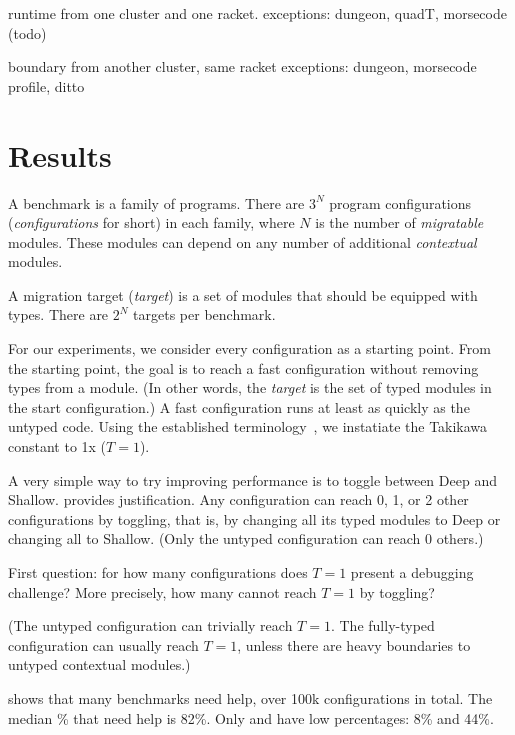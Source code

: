 \documentclass[acmsmall,review,anonymous]{acmart}
\begin{document}
runtime from one cluster and one racket.
exceptions: dungeon, quadT, morsecode (todo)

boundary from another cluster, same racket
exceptions: dungeon, morsecode
profile, ditto


\section{Results}
\label{s:data}

A benchmark is a family of programs.
There are $3^N$ program configurations (\emph{configurations} for short)
in each family, where $N$ is the number of \emph{migratable} modules.
These modules can depend on any number of additional \emph{contextual} modules.

A migration target (\emph{target}) is a set of modules that should be equipped
with types.
There are $2^N$ targets per benchmark.

For our experiments, we consider every configuration as a starting point.
From the starting point, the goal is to reach a fast configuration without
removing types from a module.
(In other words, the \emph{target} is the set of typed modules in the start
configuration.)
A fast configuration runs at least as quickly as the untyped code.
Using the established terminology~\cite{vss-popl-2017,bbst-oopsla-2017},
we instatiate the Takikawa constant to 1x ($T=1$).

A very simple way to try improving performance is to toggle between
Deep and Shallow.
\citet{g-pldi-2022} provides justification.
Any configuration can reach 0, 1, or 2 other configurations by
toggling, that is, by changing all its typed modules to Deep or
changing all to Shallow.
(Only the untyped configuration can reach 0 others.)

First question: for how many configurations does $T=1$ present a debugging challenge?
More precisely, how many cannot reach $T=1$ by toggling?

(The untyped configuration can trivially reach $T=1$.
The fully-typed configuration can usually reach $T=1$, unless there are heavy
boundaries to untyped contextual modules.)

 shows that many benchmarks need help,
over 100k configurations in total.
The median \% that need help is 82\%.
Only  and  have low percentages: 8\% and 44\%.
\end{document}
